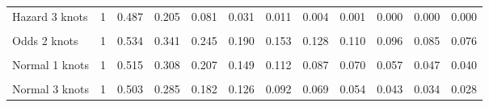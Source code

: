 \documentclass[
]{article}
\begin{document}
\begin{table}[H]
{\begin{tabular}[t]{lrrrrrrrrrrr}
Hazard 3 knots & 1 & 0.487 & 0.205 & 0.081 & 0.031 & 0.011 & 0.004 & 0.001 & 0.000 & 0.000 & 0.000\\
\cellcolor{gray!10}{Odds 1 knots} & \cellcolor{gray!10}{1} & \cellcolor{gray!10}{0.532} & \cellcolor{gray!10}{0.337} & \cellcolor{gray!10}{0.241} & \cellcolor{gray!10}{0.186} & \cellcolor{gray!10}{0.150} & \cellcolor{gray!10}{0.125} & \cellcolor{gray!10}{0.107} & \cellcolor{gray!10}{0.093} & \cellcolor{gray!10}{0.082} & \cellcolor{gray!10}{0.073}\\
Odds 2 knots & 1 & 0.534 & 0.341 & 0.245 & 0.190 & 0.153 & 0.128 & 0.110 & 0.096 & 0.085 & 0.076\\
\cellcolor{gray!10}{Odds 3 knots} & \cellcolor{gray!10}{1} & \cellcolor{gray!10}{0.498} & \cellcolor{gray!10}{0.277} & \cellcolor{gray!10}{0.180} & \cellcolor{gray!10}{0.129} & \cellcolor{gray!10}{0.098} & \cellcolor{gray!10}{0.078} & \cellcolor{gray!10}{0.064} & \cellcolor{gray!10}{0.054} & \cellcolor{gray!10}{0.046} & \cellcolor{gray!10}{0.040}\\
Normal 1 knots & 1 & 0.515 & 0.308 & 0.207 & 0.149 & 0.112 & 0.087 & 0.070 & 0.057 & 0.047 & 0.040\\
\cellcolor{gray!10}{Normal 2 knots} & \cellcolor{gray!10}{1} & \cellcolor{gray!10}{0.538} & \cellcolor{gray!10}{0.350} & \cellcolor{gray!10}{0.253} & \cellcolor{gray!10}{0.194} & \cellcolor{gray!10}{0.154} & \cellcolor{gray!10}{0.126} & \cellcolor{gray!10}{0.106} & \cellcolor{gray!10}{0.090} & \cellcolor{gray!10}{0.077} & \cellcolor{gray!10}{0.067}\\
Normal 3 knots & 1 & 0.503 & 0.285 & 0.182 & 0.126 & 0.092 & 0.069 & 0.054 & 0.043 & 0.034 & 0.028\\
\bottomrule
\end{tabular}}
\end{table}
\end{document}
